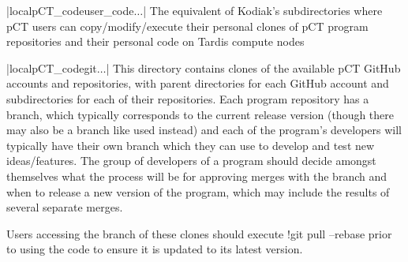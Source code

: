 \begin{tcbenvironment}
\begin{tcbparbox}%
     |\dirsep local\dirsep pCT\_code\dirsep user\_code\dirsep{}\dirsep$\dots$|
\bfdash The equivalent of Kodiak's  subdirectories where pCT users can copy/modify/execute their personal clones of pCT program repositories and their personal code on Tardis compute nodes
\end{tcbparbox}
\begin{tcbparbox}|\dirsep local\dirsep pCT\_code\dirsep git\dirsep{}\dirsep{}\dirsep $\dots$|
\bfdash This directory contains clones of the available pCT GitHub accounts and repositories, with parent directories for each GitHub account and subdirectories for each of their repositories.  Each program repository has a  branch, which typically corresponds to the current release version (though there may also be a branch like  used instead) and each of the program's developers will typically have their own branch which they can use to develop and test new ideas/features.  The group of developers of a program should decide amongst themselves what the process will be for approving merges with the  branch and when to release a new version of the program, which may include the results of several separate merges.\\\par

Users accessing the  branch of these clones should execute \tcbinlinebashbox!{git pull --rebase} prior to using the code to ensure it is updated to its latest version.\\\par


\end{tcbparbox}
\end{tcbenvironment}
